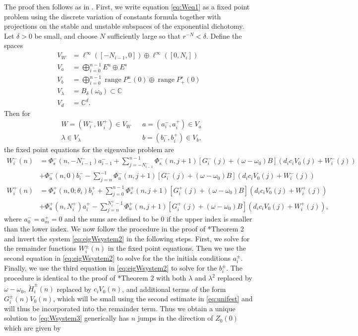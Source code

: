 \documentclass[12pt]{article}
\def\C{{\mathbb C}}
\DeclareMathOperator{\ran}{range}
\begin{document}
The proof then follows as in \cites{Parker2020,Sandstede1998}. First, we write equation \cref{eq:Weq1} as a fixed point problem using the discrete variation of constants formula together with projections on the stable and unstable subspaces of the exponential dichotomy. Let $\delta > 0$ be small, and choose $N$ sufficiently large so that $r^{-N} < \delta$. Define the spaces
\begin{align*}
V_W &= \ell^\infty([-N_{i-1}, 0]) \oplus \ell^\infty([0, N_i])  \\
V_a &= \bigoplus_{i=0}^{n-1} E^u \oplus E^s \\
V_b &= \bigoplus_{i=0}^{n-1} \ran P_-^u(0) \oplus \ran P_+^s(0)\\
V_\lambda &= B_\delta(\omega_0) \subset \C \\
V_d &= \C^d.
\end{align*}
Then for
\begin{align*}
&W = (W_i^-, W_i^+) \in V_W  && a = (a_i^-, a_i^+) \in V_a \\
&\lambda \in V_\lambda  &&b = (b_i^-, b_i^+) \in V_b,
\end{align*}
the fixed point equations for the eigenvalue problem are
\begin{equation*}\label{fpeig}
\begin{aligned}
W_i^-(n) &= 
\Phi_s^-(n, -N_{i-1}^-) a_{i-1}^- + \sum_{j = -N_{i-1}^-}^{n-1} \Phi_s^-(n, j+1)
[G_i^-(j) + (\omega - \omega_0) B](d_i c_i V_0(j) + W_i^-(j))
 \\
&+ \Phi_u^-(n, 0) b_i^- - \sum_{j = n}^{-1} \Phi_u^-(n, j+1) 
[G_i^-(j) + (\omega - \omega_0) B](d_i c_i V_0(j) + W_i^-(j))\\
W_i^+(n) &= \Phi_s^+(n, 0; \theta_i) b_i^+ + \sum_{j = 0}^{n-1} \Phi_s^+(n, j+1) 
[G_i^+(j) + (\omega - \omega_0) B](d_i c_i V_0(j) + W_i^+(j))\\
&+ \Phi_u^+(n, N_i^+) a_i^+ - \sum_{j = n}^{N_i^+-1} \Phi_u^+(n, j+1) 
[G_i^+(j) + (\omega - \omega_0) B](d_i c_i V_0(j) + W_i^+(j)),
\end{aligned}
\end{equation*}
where $a_0^- = a_m^+ = 0$ and the sums are defined to be $0$ if the upper index is smaller than the lower index. We now follow the procedure in the proof of \cite{Parker2020}*{Theorem 2} and invert the system \cref{eq:eigWsystem2} in the following steps. First, we solve for the remainder functions $W_i^\pm(n)$ in the fixed point equations. Then we use the second equation in \cref{eq:eigWsystem2} to solve for the  the initials conditions $a_i^\pm$. Finally, we use the third equation in \cref{eq:eigWsystem2} to solve for the $b_i^\pm$. The procedure is identical to the proof of \cite{Parker2020}*{Theorem 2} with both $\lambda$ and $\lambda^2$ replaced by $\omega - \omega_0$, $\tilde{H}_i^\pm(n)$ replaced by $c_i V_0(n)$, and additional terms of the form $G_i^\pm(n) V_0(n)$, which will be small using the second estimate in \cref{eq:unifest} and will thus be incorporated into the remainder term. Thus we obtain a unique solution to \cref{eq:Wsystem3} generically has $n$ jumps in the direction of $Z_0(0)$ which are given by 
\end{document}

